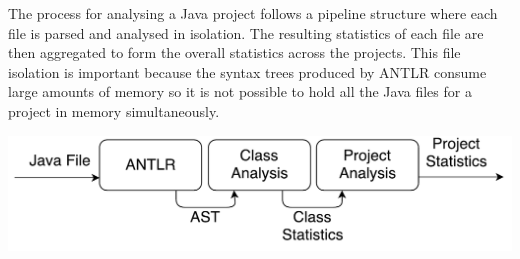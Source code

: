 The process for analysing a Java project follows a pipeline structure where each file is parsed and analysed in isolation. The resulting statistics of each file are then aggregated to form the overall statistics across the projects. This file isolation is important because the syntax trees produced by ANTLR consume large amounts of memory so it is not possible to hold all the Java files for a project in memory simultaneously.
\newline

\begin{center}
	\includegraphics[scale=0.70]{AntlrPipeline.pdf}
\end{center}

